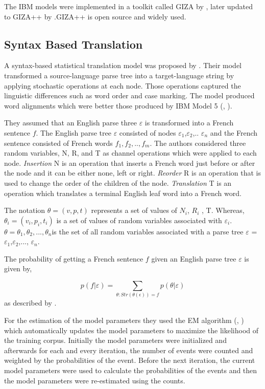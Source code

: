 The IBM models were implemented in a toolkit called GIZA by \cite{Giza}, later updated to GIZA++ by \cite{Och:2000}.GIZA++ is open source and widely used.

\subsection{Syntax Based Translation}
A syntax-based statistical translation model was proposed by \cite{Yamada:2001:SST:1073012.1073079}. Their model transformed a source-language parse tree into a target-language string by applying stochastic operations at each node. Those operations captured the linguistic differences such as word order and case marking. The model produced word alignments which were better those produced by IBM Model 5 (\citeauthor{Brown:1993:MSM:972470.972474}, \citeyear{Brown:1993:MSM:972470.972474}). 

They assumed that an English parse three $\varepsilon$  is transformed into a French sentence $f$. The English parse tree $\varepsilon$ consisted of nodes $\varepsilon_1$,$\varepsilon_2$,.. $\varepsilon_n$ and the French sentence consisted of French words $f_1,f_2,..,f_m$.
The authors considered three random variables, N, R, and T as channel operations which were applied to each node. \textit{Insertion} N is an operation that inserts a French word just before or after the node and it can be either none, left or right. \textit{Reorder} R is an operation that is used to change the order of the children of the node. \textit{Translation} T is an operation which translates a terminal English leaf word into a French word. 

The notation $ \theta = ( v, p,t )$  represents a  set of values of $N_i$, $R_i$ , T. Whereas, $ \theta_i = ( v_i, p_i,t_i )$  is a set of values of random variables associated with $\varepsilon_i$. $ \theta = \theta_1,\theta_2,...,\theta_n$is the set of all random variables associated with a parse tree $\varepsilon$ = $\varepsilon_1$,$\varepsilon_2$,..., $\varepsilon_n$.

 The probability of getting a French sentence $f$ given an English parse tree $\varepsilon$ is given by,
 
 \begin{equation}
     p(f|\varepsilon)=\sum_{\theta:Str(\theta(\epsilon))=f}p(\theta|\varepsilon)
 \end{equation}
as described by \cite{Yamada:2001:SST:1073012.1073079}.

For the estimation of the model parameters they used the EM algorithm (\citeauthor{10.2307/2984875}, \citeyear{10.2307/2984875}) which automatically updates the model parameters to maximize the likelihood of the training corpus. Initially the model parameters were initialized and afterwards for each and every iteration, the number of events were counted and weighted by the probabilities of the event. Before the next iteration, the current model parameters were used to calculate the probabilities of the events and then the model parameters were re-estimated using the counts.

